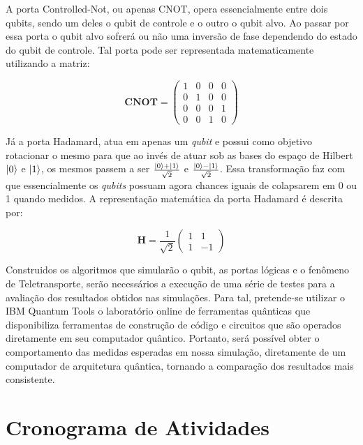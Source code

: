 \documentclass[12pt,oneside,brazil,hidelinks,article,sumario=tradicional,a4paper]{abntex2}
\begin{document}
A porta Controlled-Not, ou apenas CNOT, opera essencialmente entre dois qubits, sendo um deles o qubit de controle e o outro o qubit alvo. Ao passar por essa porta o qubit alvo sofrerá ou não uma inversão de fase dependendo do estado do qubit de controle. Tal porta pode ser representada matematicamente utilizando a matriz:


\begin{displaymath}\label{CNOTMATRIX}
\mathbf{CNOT}=\left(\begin{array}{cccc}
1 & 0 & 0 & 0\\
0 & 1 & 0 & 0\\
0 & 0 & 0 & 1\\
0 & 0 & 1 & 0
\end{array}\right)
\end{displaymath}


Já a porta Hadamard, atua em apenas um \textit{qubit} e possui como objetivo rotacionar o mesmo para que ao invés de atuar sob as bases do espaço de Hilbert $\ket{0}$ e $\ket{1}$, os mesmos passem a ser $\frac{\ket{0} + \ket{1}}{\sqrt{2}}$ e $\frac{\ket{0} - \ket{1}}{\sqrt{2}}$. Essa transformação faz com que essencialmente os \textit{qubits} possuam agora chances iguais de colapsarem em 0 ou 1 quando medidos.
A representação matemática da porta Hadamard é descrita por:


\begin{displaymath}\label{HADAMARDMATRIX}
\mathbf{H}= \frac{1}{\sqrt{2}}\left(\begin{array}{cc}
1 & 1 \\
1 & -1 
\end{array}\right)
\end{displaymath}



Construidos os algoritmos que simularão o qubit, as portas lógicas e o fenômeno de Teletransporte, serão necessários a execução de uma série de testes para a avaliação dos resultados obtidos nas simulações. Para tal, pretende-se utilizar o IBM Quantum Tools o laboratório online de ferramentas quânticas que disponibiliza ferramentas de construção de código e circuitos que são operados diretamente em seu computador quântico. Portanto, será possível obter o comportamento das medidas esperadas em nossa simulação, diretamente de um computador de arquitetura quântica, tornando a comparação dos resultados mais consistente.

\clearpage

\section{Cronograma de Atividades}
\end{document}
